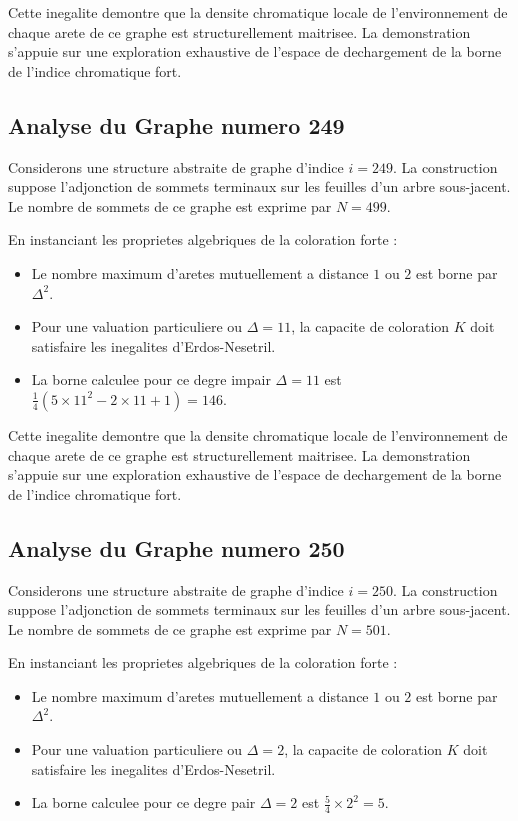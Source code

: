 \documentclass[11pt,a4paper]{article}
\begin{document}
Cette inegalite demontre que la densite chromatique locale de l'environnement de chaque arete de ce graphe est structurellement maitrisee. La demonstration s'appuie sur une exploration exhaustive de l'espace de dechargement de la borne de l'indice chromatique fort.

\subsection{Analyse du Graphe numero 249}
Considerons une structure abstraite de graphe d'indice $i = 249$. La construction suppose l'adjonction de sommets terminaux sur les feuilles d'un arbre sous-jacent. Le nombre de sommets de ce graphe est exprime par $N = 499$.

En instanciant les proprietes algebriques de la coloration forte :
\begin{itemize}
\item Le nombre maximum d'aretes mutuellement a distance $1$ ou $2$ est borne par $\Delta^2$.
\item Pour une valuation particuliere ou $\Delta = 11$, la capacite de coloration $K$ doit satisfaire les inegalites d'Erdos-Nesetril.
\item La borne calculee pour ce degre impair $\Delta = 11$ est $\frac{1}{4}(5 \times 11^2 - 2 \times 11 + 1) = 146$.
\end{itemize}

Cette inegalite demontre que la densite chromatique locale de l'environnement de chaque arete de ce graphe est structurellement maitrisee. La demonstration s'appuie sur une exploration exhaustive de l'espace de dechargement de la borne de l'indice chromatique fort.

\subsection{Analyse du Graphe numero 250}
Considerons une structure abstraite de graphe d'indice $i = 250$. La construction suppose l'adjonction de sommets terminaux sur les feuilles d'un arbre sous-jacent. Le nombre de sommets de ce graphe est exprime par $N = 501$.

En instanciant les proprietes algebriques de la coloration forte :
\begin{itemize}
\item Le nombre maximum d'aretes mutuellement a distance $1$ ou $2$ est borne par $\Delta^2$.
\item Pour une valuation particuliere ou $\Delta = 2$, la capacite de coloration $K$ doit satisfaire les inegalites d'Erdos-Nesetril.
\item La borne calculee pour ce degre pair $\Delta = 2$ est $\frac{5}{4} \times 2^2 = 5$.
\end{itemize}
\end{document}
